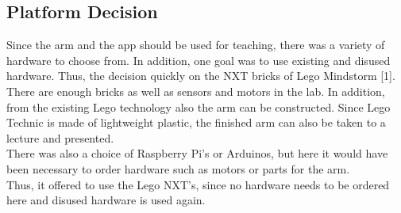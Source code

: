 \documentclass[conference]{IEEEtran}
\begin{document}
\subsection{Platform Decision}\label{sec:platform}
Since the arm and the app should be used for teaching, there was a variety of hardware to choose from. In addition, one goal was to use existing and disused hardware. Thus, the decision quickly on the NXT bricks of Lego Mindstorm [1]. There are enough bricks as well as sensors and motors in the lab. In addition, from the existing Lego technology also the arm can be constructed. Since Lego Technic is made of lightweight plastic, the finished arm can also be taken to a lecture and presented.\\
There was also a choice of Raspberry Pi's or Arduinos, but here it would have been necessary to order hardware such as motors or parts for the arm.\\
Thus, it offered to use the Lego NXT's, since no hardware needs to be ordered here and disused hardware is used again.
\end{document}
